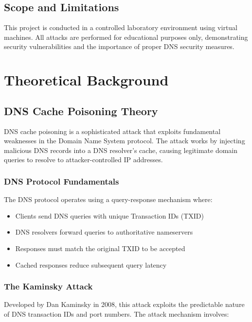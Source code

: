 \documentclass[12pt,a4paper]{article}
\begin{document}
\subsection{Scope and Limitations}

This project is conducted in a controlled laboratory environment using virtual machines. All attacks are performed for educational purposes only, demonstrating security vulnerabilities and the importance of proper DNS security measures.

\section{Theoretical Background}

\subsection{DNS Cache Poisoning Theory}

DNS cache poisoning is a sophisticated attack that exploits fundamental weaknesses in the Domain Name System protocol. The attack works by injecting malicious DNS records into a DNS resolver's cache, causing legitimate domain queries to resolve to attacker-controlled IP addresses.

\subsubsection{DNS Protocol Fundamentals}

The DNS protocol operates using a query-response mechanism where:
\begin{itemize}
    \item Clients send DNS queries with unique Transaction IDs (TXID)
    \item DNS resolvers forward queries to authoritative nameservers
    \item Responses must match the original TXID to be accepted
    \item Cached responses reduce subsequent query latency
\end{itemize}

\subsubsection{The Kaminsky Attack}

Developed by Dan Kaminsky in 2008, this attack exploits the predictable nature of DNS transaction IDs and port numbers. The attack mechanism involves:
\end{document}
